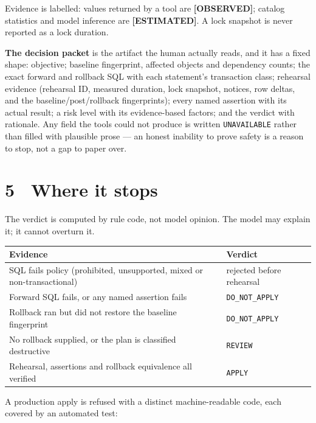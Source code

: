 \documentclass[8pt,a4paper]{extarticle}
\newcommand{\code}[1]{\texttt{\small #1}}
\begin{document}
\vspace{-0.4ex}
Evidence is labelled: values returned by a tool are \textbf{[OBSERVED]}; catalog statistics and model inference are \textbf{[ESTIMATED]}. A lock snapshot is never reported as a lock duration.

\textbf{The decision packet} is the artifact the human actually reads, and it has a fixed shape: objective; baseline fingerprint, affected objects and dependency counts; the exact forward and rollback SQL with each statement's transaction class; rehearsal evidence (rehearsal ID, measured duration, lock snapshot, notices, row deltas, and the baseline/post/rollback fingerprints); every named assertion with its actual result; a risk level with its evidence-based factors; and the verdict with rationale. Any field the tools could not produce is written \code{UNAVAILABLE} rather than filled with plausible prose --- an honest inability to prove safety is a reason to stop, not a gap to paper over.


\section*{5 \textperiodcentered\ Where it stops}
The verdict is computed by rule code, not model opinion. The model may explain it; it cannot overturn it.

\begin{tabularx}{\linewidth}{@{}Xl@{}}
\toprule
\textbf{Evidence} & \textbf{Verdict} \\
\midrule
SQL fails policy (prohibited, unsupported, mixed or non-transactional) & rejected before rehearsal \\
Forward SQL fails, or any named assertion fails & \code{DO\_NOT\_APPLY} \\
Rollback ran but did not restore the baseline fingerprint & \code{DO\_NOT\_APPLY} \\
No rollback supplied, or the plan is classified destructive & \code{REVIEW} \\
Rehearsal, assertions and rollback equivalence all verified & \code{APPLY} \\
\bottomrule
\end{tabularx}

\vspace{0.5ex}
A production apply is refused with a distinct machine-readable code, each covered by an automated test:
\end{document}
